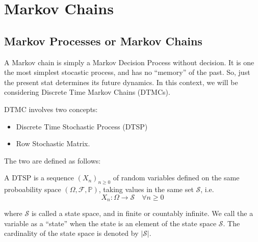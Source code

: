 \section{Markov Chains}
\subsection{Markov Processes or Markov Chains}
A Markov chain is simply a Markov Decision Process without decision. It is one the 
most simplest stocastic process, and has no ``memory'' of the past. So, just the 
present stat determines its future dynamics. In this context, we will be considering
Discrete Time Markov Chains (DTMCs).

DTMC involves two concepts:
\begin{itemize}
    \item Discrete Time Stochastic Process (DTSP)
    \item Row Stochastic Matrix.
\end{itemize}

The two are defined as follows:

\begin{definition}
    A DTSP is a sequence \({(X_n)}_{n \geq 0}\) of random variables defined on the same proboability space
    \((\Omega, \mathcal{F} , \mathbb{P} )\), taking values in the same 
    set \(\mathcal{S} \), i.e.
    \[
        X_n : \Omega \rightarrow \mathcal{S} \quad \forall n \geq 0
    \]
\end{definition}
where \(\mathcal{S} \) is called a state space, and in finite or countably infinite.
We call the a variable as a ``state'' when the state is an element of the state space \(\mathcal{S} \).
The cardinality of the state space is denoted by \(|\mathcal{S} |\).

